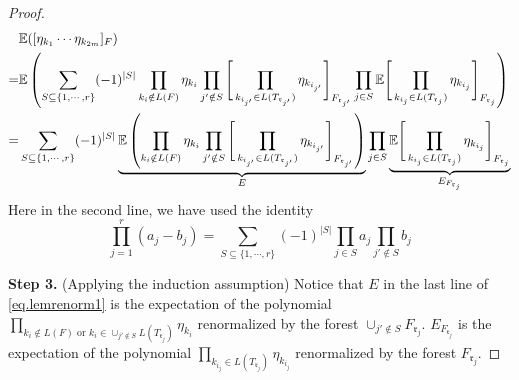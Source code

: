 \begin{proof}
 \begingroup
  \allowdisplaybreaks
  \begin{align}\label{eq.lemrenorm1}
  &\mathbb{E}([\eta_{k_1}\cdots \eta_{k_{2m}}]_F)\notag
  \\
  =&\mathbb{E}\left(\sum_{S\subseteq\{1,\cdots,r\}}(-1)^{|S|}\prod_{k_i\notin L(F)} \eta_{k_i} \prod_{j'\notin S} \Bigg[\prod_{k_{i_{j'}}\in L(T_{\mathfrak{r}_{j'}})}\eta_{k_{i_{j'}}}\Bigg]_{F_{\mathfrak{r}_{j'}}}
  \prod_{j\in S}\mathbb{E}\Bigg[\prod_{k_{i_{j}}\in L(T_{\mathfrak{r}_j})}\eta_{k_{i_j}}\Bigg]_{F_{\mathfrak{r}_j}}\right)
  \\
  =&\sum_{S\subseteq\{1,\cdots,r\}}(-1)^{|S|}\underbrace{\mathbb{E}\left(\prod_{k_{i}\notin L(F)} \eta_{k_i} \prod_{j'\notin S} \Bigg[\prod_{k_{i_{j'}}\in L(T_{\mathfrak{r}_{j'}})}\eta_{k_{i_{j'}}}\Bigg]_{F_{\mathfrak{r}_{j'}}}\right)}_{E}
  \prod_{j\in S}\underbrace{\mathbb{E}\Bigg[\prod_{k_{i_{j}}\in L(T_{\mathfrak{r}_j})}\eta_{k_{i_j}}\Bigg]_{F_{\mathfrak{r}_j}}}_{E_{F_{\mathfrak{r}_j}}}\notag
  \end{align}
 \endgroup
 Here in the second line, we have used the identity 
 \begin{equation}
  \prod_{j=1}^r (a_j-b_j)=\sum_{S\subseteq\{1,\cdots,r\}}(-1)^{|S|} \prod_{j\in S}a_j\prod_{j'\notin S}b_j
 \end{equation}
 
 
 
 
 \textbf{Step 3.} (Applying the induction assumption) Notice that $E$ in the last line of \eqref{eq.lemrenorm1} is the expectation of the polynomial $\prod_{k_i\notin L(F)\text{ or }k_i\in \cup_{j'\notin S}L(T_{\mathfrak{r}_j})}\eta_{k_i}$ renormalized by the forest $\cup_{j'\notin S}F_{\mathfrak{r}_j}$. $E_{F_{\mathfrak{r}_j}}$ is the expectation of the polynomial $\prod_{k_{i_{j}}\in L(T_{\mathfrak{r}_j})}\eta_{k_{i_j}}$ renormalized by the forest $F_{\mathfrak{r}_j}$. 
 

\end{proof}
